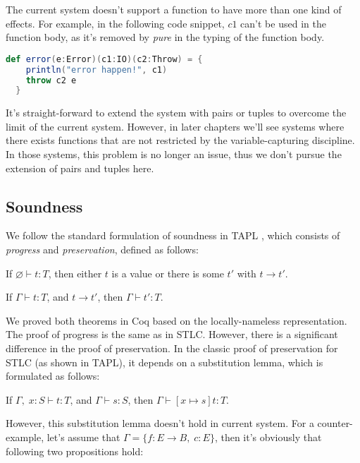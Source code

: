 The current system doesn't support a function to have more than one
kind of effects. For example, in the following code snippet, $c1$
can't be used in the function body, as it's removed by \emph{pure} in
the typing of the function body.

\begin{lstlisting}[language=Scala]
  def error(e:Error)(c1:IO)(c2:Throw) = {
    println("error happen!", c1)
    throw c2 e
  }
\end{lstlisting}

It's straight-forward to extend the system with pairs or tuples to
overcome the limit of the current system. However, in later chapters
we'll see systems where there exists functions that are not restricted
by the variable-capturing discipline.  In those systems, this problem
is no longer an issue, thus we don't pursue the extension of pairs and
tuples here.

\subsection{Soundness}

We follow the standard formulation of soundness in TAPL
\cite{bpierce2002types}, which consists of \emph{progress} and
\emph{preservation}, defined as follows:

\begin{theorem}[Progress]
If $\varnothing \vdash t : T$, then either $t$ is a value or there is some
$t'$ with $t \longrightarrow t'$.
\end{theorem}

\begin{theorem}[Preservation]
If $\Gamma \vdash t : T$, and $t \longrightarrow t'$, then $\Gamma
\vdash t' : T$.
\end{theorem}

We proved both theorems in Coq based on the locally-nameless
representation. The proof of progress is the same as in STLC. However,
there is a significant difference in the proof of preservation. In the
classic proof of preservation for STLC (as shown in TAPL), it depends
on a substitution lemma, which is formulated as follows:

\begin{lemma}
If $\Gamma,\; x:S \vdash t : T$, and $\Gamma \vdash s : S$, then $\Gamma
\vdash [x \mapsto s]t : T$.
\end{lemma}

However, this substitution lemma doesn't hold in current system. For a
counter-example, let's assume that $\Gamma = \{f: E \to B,\;
  c:E\}$, then it's obviously that following two propositions hold:


